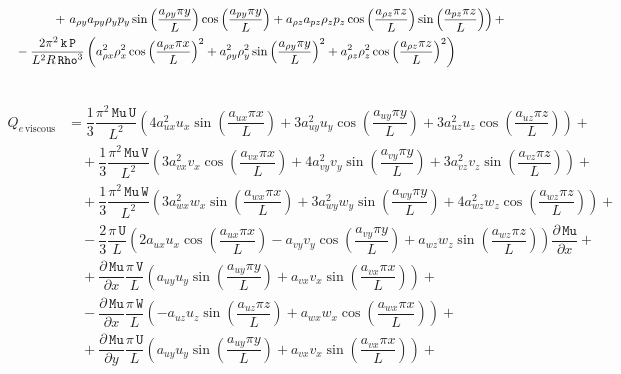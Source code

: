 \documentclass[10pt]{article}
\newcommand{\diff}[2] {\dfrac{\partial #1}{\partial #2}}
\newcommand{\Rho}{\,\mathtt{Rho}}
\newcommand{\PP}{\,\mathtt{P}}
\newcommand{\U}{\,\mathtt{U}}
\newcommand{\V}{\,\mathtt{V}}
\newcommand{\W}{\,\mathtt{W}}
\newcommand{\Mu}{\,\mathtt{Mu}}
\newcommand{\DMuDx}{\diff{\Mu}{x}}
\newcommand{\DMuDy}{\diff{\Mu}{y}}
\newcommand{\kk}{\,\mathtt{k}}
\newcommand{\workviscous}{\,\text{viscous work}}
\begin{document}
\begin{equation*}
\begin{split}
	&\qquad\qquad+\left. a_{\rho y} a_{py} \rho_y p_y \sin\left(\dfrac{a_{\rho y} \pi y}{L}\right) \cos\left(\dfrac{a_{py} \pi y}{L}\right)+ a_{\rho z} a_{pz} \rho_z p_z \cos\left(\dfrac{a_{\rho z} \pi z}{L}\right) \sin\left(\dfrac{a_{pz} \pi z}{L}\right)\right) +\\
  &\quad-\dfrac{2\pi^2 \kk \PP }{L^2 R \Rho^3}\left( a_{\rho x}^2 \rho_x^2 \cos\left(\dfrac{a_{\rho x} \pi x}{L}\right)^2+a_{\rho y}^2 \rho_y^2 \sin\left(\dfrac{a_{\rho y} \pi y}{L}\right)^2+a_{\rho z}^2 \rho_z^2 \cos\left(\dfrac{a_{\rho z} \pi z}{L}\right)^2\right)  \\ \vspace{15pt}
\end{split}
\end{equation*}


\begin{equation*}
\begin{split}
Q_{e \workviscous} &= 
\dfrac{1}{3} \dfrac{\pi^2 \Mu \U}{L^2}\left(4 a_{ux}^2 u_x \sin\left(\dfrac{a_{ux} \pi x}{L}\right)+3 a_{uy}^2 u_y \cos\left(\dfrac{a_{uy} \pi y}{L}\right)+3 a_{uz}^2 u_z \cos\left(\dfrac{a_{uz} \pi z}{L}\right)\right) +\\
  &\quad+\dfrac{1}{3} \dfrac{\pi^2 \Mu \V}{L^2}\left(3 a_{vx}^2 v_x \cos\left(\dfrac{a_{vx} \pi x}{L}\right)+4 a_{vy}^2 v_y \sin\left(\dfrac{a_{vy} \pi y}{L}\right)+3 a_{vz}^2 v_z \sin\left(\dfrac{a_{vz} \pi z}{L}\right)\right) +\\
  &\quad+\dfrac{1}{3} \dfrac{\pi^2 \Mu \W}{L^2}\left(3 a_{wx}^2 w_x \sin\left(\dfrac{a_{wx} \pi x}{L}\right)+3 a_{wy}^2 w_y \sin\left(\dfrac{a_{wy} \pi y}{L}\right)+4 a_{wz}^2 w_z \cos\left(\dfrac{a_{wz} \pi z}{L}\right)\right) +\\
  &\quad-\dfrac{2}{3} \dfrac{\pi \U}{L}\left(2 a_{ux} u_x \cos\left(\dfrac{a_{ux} \pi x}{L}\right)-a_{vy} v_y \cos\left(\dfrac{a_{vy} \pi y}{L}\right)+a_{wz} w_z \sin\left(\dfrac{a_{wz} \pi z}{L}\right)\right) \DMuDx +\\
  &\quad+ \DMuDx\dfrac{ \pi \V}{L}\left(a_{uy} u_y \sin\left(\dfrac{a_{uy} \pi y}{L}\right)+a_{vx} v_x \sin\left(\dfrac{a_{vx} \pi x}{L}\right)\right) +\\
  &\quad- \DMuDx\dfrac{ \pi \W}{L}\left(-a_{uz} u_z \sin\left(\dfrac{a_{uz} \pi z}{L}\right)+a_{wx} w_x \cos\left(\dfrac{a_{wx} \pi x}{L}\right)\right)+\\
  &\quad
+ \DMuDy \dfrac{\pi \U}{L}\left(a_{uy} u_y \sin\left(\dfrac{a_{uy} \pi y}{L}\right)+a_{vx} v_x \sin\left(\dfrac{a_{vx} \pi x}{L}\right)\right) +\\

\end{split}
\end{equation*}
\end{document}
